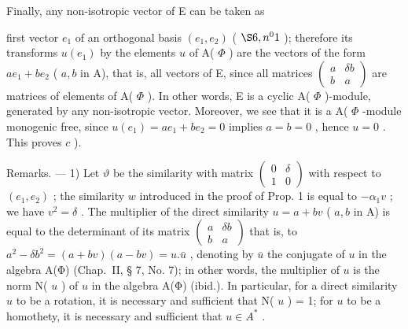 Finally, any non-isotropic vector of E can be taken as

first vector \(e_1\) of an orthogonal basis \((e_1, e_2)\) ( \(\S 6, n^0 1\) ); therefore its transforms \(u(e_1)\) by the elements \(u\) of A( \(\Phi\) ) are the vectors of the form \(ae_1 + be_2\) ( \(a, b\) in A), that is, all vectors of E, since all matrices \(\begin{pmatrix} a & \delta b \\ b & a \end{pmatrix}\) are matrices of elements of A( \(\Phi\) ). In other words, E is a cyclic A( \(\Phi\) )-module, generated by any non-isotropic vector. Moreover, we see that it is a A( \(\Phi\) -module monogenic free, since \(u(e_1) = ae_1 + be_2 = 0\) implies \(a = b = 0\) , hence \(u = 0\) . This proves \(c\) ).

Remarks. --- 1) Let \(\vartheta\) be the similarity with matrix \(\begin{pmatrix}0 & \delta \\ 1 & 0\end{pmatrix}\) with respect to \((e_1, e_2)\) ; the similarity \(w\) introduced in the proof of Prop. 1 is equal to \(-\alpha_1 v\) ; we have \(v^2 = \delta\) . The multiplier of the direct similarity \(u = a + b v\) ( \(a, b\) in A) is equal to the determinant of its matrix \(\begin{pmatrix}a & \delta b \\ b & a\end{pmatrix}\) that is, to \(a^2 - \delta b^2 = (a + b v)(a - b v) = u.\bar{u}\) , denoting by \(\bar{u}\) the conjugate of \(u\) in the algebra A(Φ) (Chap.~II, § 7, No. 7); in other words, the multiplier of \(u\) is the norm N( \(u\) ) of \(u\) in the algebra A(Φ) (ibid.). In particular, for a direct similarity \(u\) to be a rotation, it is necessary and sufficient that N( \(u\) ) = 1; for \(u\) to be a homothety, it is necessary and sufficient that \(u \in A^*\) .

